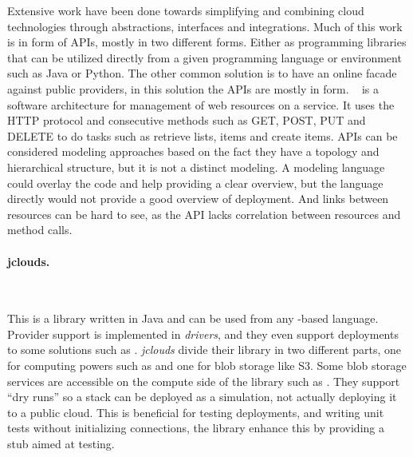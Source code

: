 Extensive work have been done towards simplifying and combining cloud technologies through
abstractions, interfaces and integrations.
Much of this work is in form of APIs, mostly in two different forms.
Either as programming libraries that can be utilized directly from a given 
programming language or environment such as Java or Python.
The other common solution is to have an online facade against public providers,
in this solution the APIs are mostly in  form.
~\cite{rest:fielding00} is a software architecture for management of web resources
on a service. It uses the HTTP protocol and consecutive methods such as GET, POST, PUT and DELETE
to do tasks such as retrieve lists, items and create items.
APIs can be considered modeling approaches based on the fact they have a topology 
and hierarchical structure, 
but it is not a distinct modeling. 
A modeling language could overlay the code and help providing a clear overview, 
but the language directly would not provide a good overview of deployment. 
And links between resources can be hard to see, 
as the API lacks correlation between resources and method calls. 




\paragraph{jclouds.}~\cite{jclouds}

This is a library written in Java and can be used from any -based language.
Provider support is implemented in \emph{drivers}, and they even support deployments
to some  solutions such as .
\emph{jclouds} divide their library in two different parts, one for computing powers 
such as  and one for blob storage like S3. 
Some blob storage services are accessible on the compute side of the library such
as .
They support ``dry runs'' so a stack can be deployed as a simulation, not 
actually deploying it to a public cloud.
This is beneficial for testing deployments, and writing unit tests without initializing
connections, the library enhance this by providing a stub aimed at testing.

